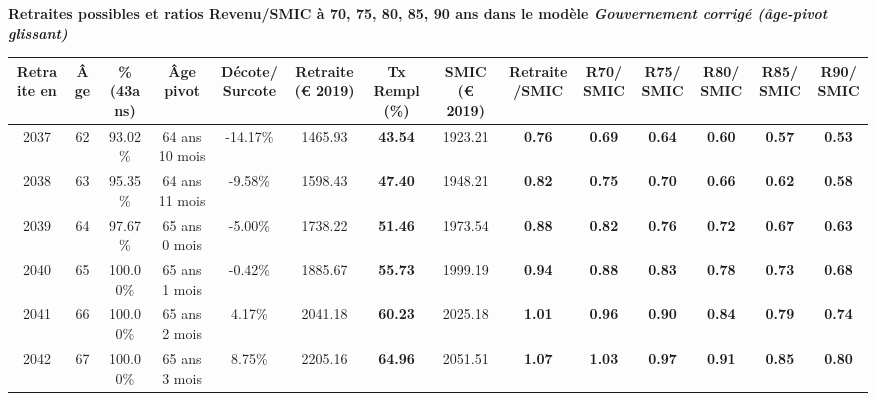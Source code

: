  \vspace{0.1cm} 
{\bf \noindent Retraites possibles et ratios Revenu/SMIC à 70, 75, 80, 85, 90 ans dans le modèle \emph{Gouvernement corrigé (âge-pivot glissant)}}  
 
\begin{adjustbox}{max width=\textwidth} 
\begin{tabular}[htb]{|c|c||c|c|c||c|c||c|c||c|c|c|c|c|} 
\hline 
 Retraite en &  Âge &  \%(43ans) &  Âge pivot &  Décote/Surcote &  Retraite (\euro{} 2019) &  Tx Rempl(\%) &  SMIC (\euro{} 2019) &  Retraite/SMIC &  R70/SMIC &  R75/SMIC &  R80/SMIC &  R85/SMIC &  R90/SMIC \\ 
\hline \hline 
 2037 &  62 &  93.02\% &  64 ans 10 mois &  -14.17\% &  1465.93 &  {\bf 43.54} &  1923.21 &  {\bf {\color{red} 0.76}} &  {\bf {\color{red} 0.69}} &  {\bf {\color{red} 0.64}} &  {\bf {\color{red} 0.60}} &  {\bf {\color{red} 0.57}} &  {\bf {\color{red} 0.53}} \\ 
\hline 
 2038 &  63 &  95.35\% &  64 ans 11 mois &  -9.58\% &  1598.43 &  {\bf 47.40} &  1948.21 &  {\bf {\color{red} 0.82}} &  {\bf {\color{red} 0.75}} &  {\bf {\color{red} 0.70}} &  {\bf {\color{red} 0.66}} &  {\bf {\color{red} 0.62}} &  {\bf {\color{red} 0.58}} \\ 
\hline 
 2039 &  64 &  97.67\% &  65 ans 0 mois &  -5.00\% &  1738.22 &  {\bf 51.46} &  1973.54 &  {\bf {\color{red} 0.88}} &  {\bf {\color{red} 0.82}} &  {\bf {\color{red} 0.76}} &  {\bf {\color{red} 0.72}} &  {\bf {\color{red} 0.67}} &  {\bf {\color{red} 0.63}} \\ 
\hline 
 2040 &  65 &  100.00\% &  65 ans 1 mois &  -0.42\% &  1885.67 &  {\bf 55.73} &  1999.19 &  {\bf {\color{red} 0.94}} &  {\bf {\color{red} 0.88}} &  {\bf {\color{red} 0.83}} &  {\bf {\color{red} 0.78}} &  {\bf {\color{red} 0.73}} &  {\bf {\color{red} 0.68}} \\ 
\hline 
 2041 &  66 &  100.00\% &  65 ans 2 mois &  4.17\% &  2041.18 &  {\bf 60.23} &  2025.18 &  {\bf 1.01} &  {\bf {\color{red} 0.96}} &  {\bf {\color{red} 0.90}} &  {\bf {\color{red} 0.84}} &  {\bf {\color{red} 0.79}} &  {\bf {\color{red} 0.74}} \\ 
\hline 
 2042 &  67 &  100.00\% &  65 ans 3 mois &  8.75\% &  2205.16 &  {\bf 64.96} &  2051.51 &  {\bf 1.07} &  {\bf 1.03} &  {\bf {\color{red} 0.97}} &  {\bf {\color{red} 0.91}} &  {\bf {\color{red} 0.85}} &  {\bf {\color{red} 0.80}} \\ 
\hline 
\hline 
\end{tabular} 
\end{adjustbox} 
 
